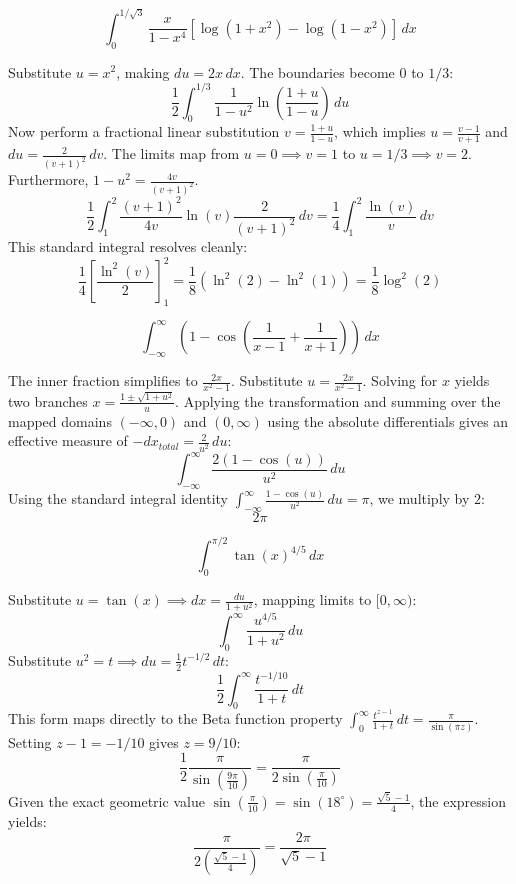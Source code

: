 \begin{questions}
    \question \[ \int_0^{1/\sqrt{3}} \frac{x}{1-x^4} [\log(1+x^2) - \log(1-x^2)] \,dx \]
    \begin{solution}
        Substitute $u = x^2$, making $du = 2x \,dx$. The boundaries become $0$ to $1/3$:
        \[ \frac{1}{2} \int_0^{1/3} \frac{1}{1 - u^2} \ln\left(\frac{1+u}{1-u}\right) \,du \]
        Now perform a fractional linear substitution $v = \frac{1+u}{1-u}$, which implies $u = \frac{v-1}{v+1}$ and $du = \frac{2}{(v+1)^2} \,dv$. The limits map from $u=0 \implies v=1$ to $u=1/3 \implies v=2$. Furthermore, $1 - u^2 = \frac{4v}{(v+1)^2}$.
        \[ \frac{1}{2} \int_1^2 \frac{(v+1)^2}{4v} \ln(v) \frac{2}{(v+1)^2} \,dv = \frac{1}{4} \int_1^2 \frac{\ln(v)}{v} \,dv \]
        This standard integral resolves cleanly:
        \[ \frac{1}{4} \left[ \frac{\ln^2(v)}{2} \right]_1^2 = \frac{1}{8} (\ln^2(2) - \ln^2(1)) = \frac{1}{8}\log^2(2) \]
    \end{solution}

    \question \[ \int_{-\infty}^\infty \left( 1 - \cos\left(\frac{1}{x-1} + \frac{1}{x+1}\right) \right) \,dx \]
    \begin{solution}
        The inner fraction simplifies to $\frac{2x}{x^2-1}$. Substitute $u = \frac{2x}{x^2-1}$. Solving for $x$ yields two branches $x = \frac{1 \pm \sqrt{1+u^2}}{u}$. Applying the transformation and summing over the mapped domains $(-\infty, 0)$ and $(0, \infty)$ using the absolute differentials gives an effective measure of $-dx_{total} = \frac{2}{u^2} \,du$:
        \[ \int_{-\infty}^\infty \frac{2(1 - \cos(u))}{u^2} \,du \]
        Using the standard integral identity $\int_{-\infty}^\infty \frac{1-\cos(u)}{u^2} \,du = \pi$, we multiply by $2$:
        \[ 2\pi \]
    \end{solution}

    \question \[ \int_0^{\pi/2} \tan(x)^{4/5} \,dx \]
    \begin{solution}
        Substitute $u = \tan(x) \implies dx = \frac{du}{1+u^2}$, mapping limits to $[0, \infty)$:
        \[ \int_0^\infty \frac{u^{4/5}}{1+u^2} \,du \]
        Substitute $u^2 = t \implies du = \frac{1}{2}t^{-1/2} \,dt$:
        \[ \frac{1}{2} \int_0^\infty \frac{t^{-1/10}}{1+t} \,dt \]
        This form maps directly to the Beta function property $\int_0^\infty \frac{t^{z-1}}{1+t} \,dt = \frac{\pi}{\sin(\pi z)}$. Setting $z - 1 = -1/10$ gives $z = 9/10$:
        \[ \frac{1}{2} \frac{\pi}{\sin\left(\frac{9\pi}{10}\right)} = \frac{\pi}{2\sin\left(\frac{\pi}{10}\right)} \]
        Given the exact geometric value $\sin(\frac{\pi}{10}) = \sin(18^\circ) = \frac{\sqrt{5}-1}{4}$, the expression yields:
        \[ \frac{\pi}{2 \left( \frac{\sqrt{5}-1}{4} \right)} = \frac{2\pi}{\sqrt{5}-1} \]
    \end{solution}
\end{questions}